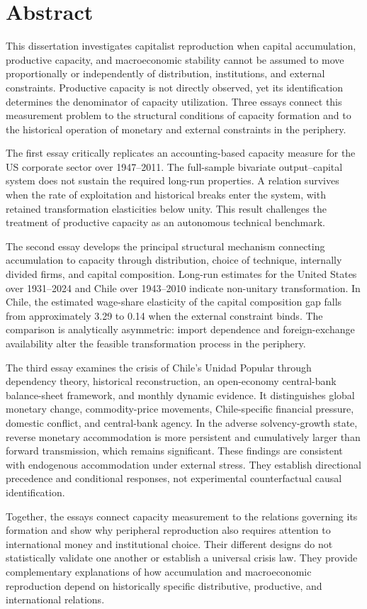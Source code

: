 \chapter*{Abstract}

This dissertation investigates capitalist reproduction when capital accumulation, productive capacity, and macroeconomic stability cannot be assumed to move proportionally or independently of distribution, institutions, and external constraints. Productive capacity is not directly observed, yet its identification determines the denominator of capacity utilization. Three essays connect this measurement problem to the structural conditions of capacity formation and to the historical operation of monetary and external constraints in the periphery.

The first essay critically replicates an accounting-based capacity measure for the US corporate sector over 1947--2011. The full-sample bivariate output--capital system does not sustain the required long-run properties. A relation survives when the rate of exploitation and historical breaks enter the system, with retained transformation elasticities below unity. This result challenges the treatment of productive capacity as an autonomous technical benchmark.

The second essay develops the principal structural mechanism connecting accumulation to capacity through distribution, choice of technique, internally divided firms, and capital composition. Long-run estimates for the United States over 1931--2024 and Chile over 1943--2010 indicate non-unitary transformation. In Chile, the estimated wage-share elasticity of the capital composition gap falls from approximately 3.29 to 0.14 when the external constraint binds. The comparison is analytically asymmetric: import dependence and foreign-exchange availability alter the feasible transformation process in the periphery.

The third essay examines the crisis of Chile's Unidad Popular through dependency theory, historical reconstruction, an open-economy central-bank balance-sheet framework, and monthly dynamic evidence. It distinguishes global monetary change, commodity-price movements, Chile-specific financial pressure, domestic conflict, and central-bank agency. In the adverse solvency-growth state, reverse monetary accommodation is more persistent and cumulatively larger than forward transmission, which remains significant. These findings are consistent with endogenous accommodation under external stress. They establish directional precedence and conditional responses, not experimental counterfactual causal identification.

Together, the essays connect capacity measurement to the relations governing its formation and show why peripheral reproduction also requires attention to international money and institutional choice. Their different designs do not statistically validate one another or establish a universal crisis law. They provide complementary explanations of how accumulation and macroeconomic reproduction depend on historically specific distributive, productive, and international relations.
